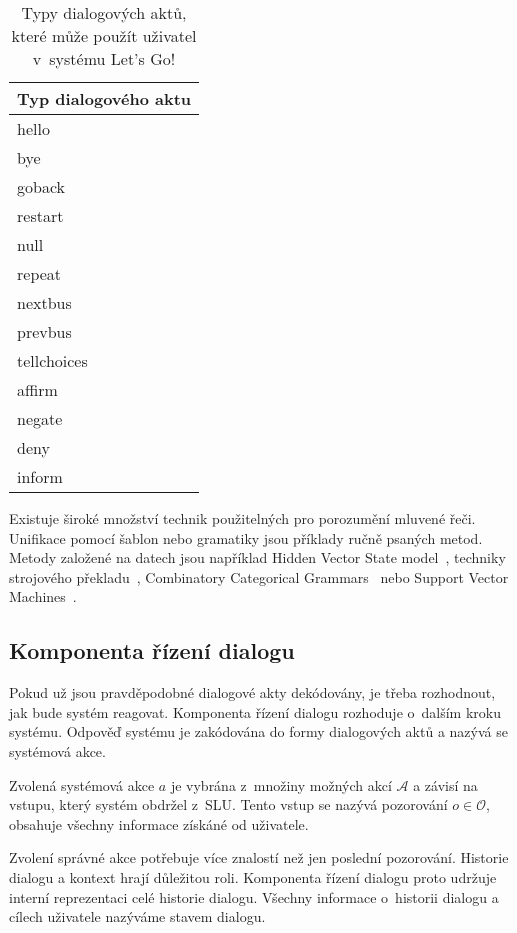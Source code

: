 \begin{table}[b!]
\begin{center}
\begin{tabular}{|l|}
\hline
Typ dialogového aktu \\
\hline
\hline
hello \\
\hline
bye \\
\hline
goback \\
\hline
restart \\
\hline
null \\
\hline
repeat \\
\hline
nextbus \\
\hline
prevbus \\
\hline
tellchoices \\
\hline
affirm \\
\hline
negate \\
\hline
deny \\
\hline
inform \\
\hline
\end{tabular}
\caption{Typy dialogových aktů, které může použít uživatel v~systému Let's Go!}
\label{tab:dstcdat}
\end{center}
\end{table}

Existuje široké množství technik použitelných pro porozumění mluvené řeči.
Unifikace pomocí šablon nebo gramatiky jsou příklady ručně psaných metod.
Metody založené na datech jsou například Hidden Vector State model~\cite{he2005semantic}, techniky strojového překladu~\cite{wong2007learning}, Combinatory Categorical Grammars~\cite{zettlemoyer2007online} nebo Support Vector Machines~\cite{mairesse2009spoken}.

\subsection{Komponenta řízení dialogu}

Pokud už jsou pravděpodobné dialogové akty dekódovány, je třeba rozhodnout, jak bude systém reagovat.
Komponenta řízení dialogu rozhoduje o~dalším kroku systému.
Odpověď systému je zakódována do formy dialogových aktů a nazývá se systémová akce.

Zvolená systémová akce $a$ je vybrána z~množiny možných akcí $\mathcal{A}$ a závisí na vstupu, který systém obdržel z~SLU.
Tento vstup se nazývá pozorování $o \in \mathcal{O}$, obsahuje všechny informace získáné od uživatele.

Zvolení správné akce potřebuje více znalostí než jen poslední pozorování.
Historie dialogu a kontext hrají důležitou roli.
Komponenta řízení dialogu proto udržuje interní reprezentaci celé historie dialogu.
Všechny informace o~historii dialogu a cílech uživatele nazýváme stavem dialogu.

